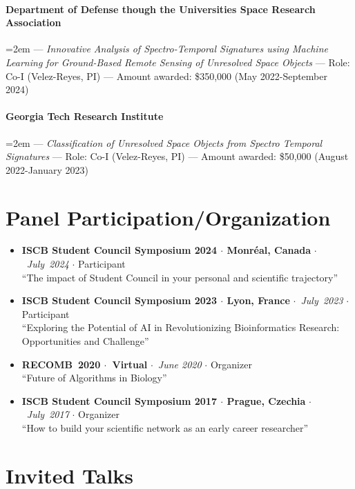 \documentclass[10pt,letterpaper]{article}
\newcommand{\bigdot}{$\cdot$\xspace}
\begin{document}
\paragraph{Department of Defense though the Universities Space Research Association}   \hangindent=2em --- 
	\textit{Innovative Analysis of Spectro-Temporal Signatures using Machine Learning for Ground-Based Remote Sensing of Unresolved Space Objects} --- 
	Role: Co-I (Velez-Reyes, PI) --- Amount awarded: \$350,000 (May 2022-September 2024)

\paragraph{Georgia Tech Research Institute}  \hangindent=2em  --- 
	\textit{Classification of Unresolved Space Objects from Spectro Temporal Signatures} ---
	Role: Co-I (Velez-Reyes, PI) --- Amount awarded: \$50,000 (August 2022-January 2023)


\section*{Panel Participation/Organization}
\begin{itemize}[leftmargin=*,labelindent=5pt,itemindent=-15pt]
  \item \textbf{ISCB Student Council Symposium 2024 \bigdot  Monr\'eal, Canada} \bigdot~\textit{July~2024} \bigdot Participant \\ ``The impact of Student Council in your personal and scientific trajectory''  
  \item \textbf{ISCB Student Council Symposium 2023 \bigdot  Lyon, France} \bigdot~\textit{July~2023} \bigdot Participant  \\ ``Exploring the Potential of AI in Revolutionizing Bioinformatics Research: Opportunities and Challenge''
  \item \textbf{RECOMB~2020 \bigdot~Virtual} \bigdot~\textit{June 2020} \bigdot  Organizer  \\ ``Future of Algorithms in Biology''
    \item \textbf{ISCB Student Council Symposium 2017 \bigdot Prague, Czechia} \bigdot~\textit{July~2017} \bigdot Organizer  \\ ``How to build your scientific network as an early career researcher''
\end{itemize}

\section*{Invited Talks}
\end{document}
